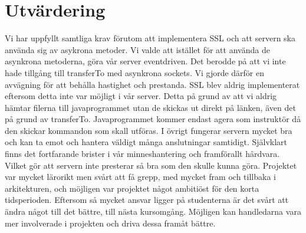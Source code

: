 \section{Utvärdering}
Vi har uppfyllt samtliga krav förutom att implementera SSL och att servern ska använda sig av asykrona metoder. Vi  valde att istället för att använda de asynkrona metoderna, göra vår server eventdriven. Det berodde på att vi inte hade tillgång till transferTo med asynkrona sockets. Vi gjorde därför en avvägning för att behålla hastighet och prestanda. SSL blev aldrig implementerat eftersom detta inte var möjligt i vår server. Detta på grund av att vi aldrig hämtar filerna till javaprogrammet utan de skickas ut direkt på länken, även det på grund av transferTo. Javaprogrammet kommer endast agera som instruktör då den skickar kommandon som skall utföras. I övrigt fungerar servern mycket bra och kan ta emot och hantera väldigt många anslutningar samtidigt. Självklart finns det fortfarande brister i vår minneshantering och framförallt hårdvara. Vilket gör att servern inte presterar så bra som den skulle kunna göra. Projektet var mycket lärorikt men svårt att få grepp, med mycket fram och tillbaka i arkitekturen,   och möjligen var projektet något ambitiöst för den korta tidsperioden. 
Eftersom så mycket ansvar ligger på studenterna är det svårt att ändra något till det bättre, till nästa kursomgång. Möjligen kan handledarna vara mer involverade i projekten och driva dessa framåt bättre.

